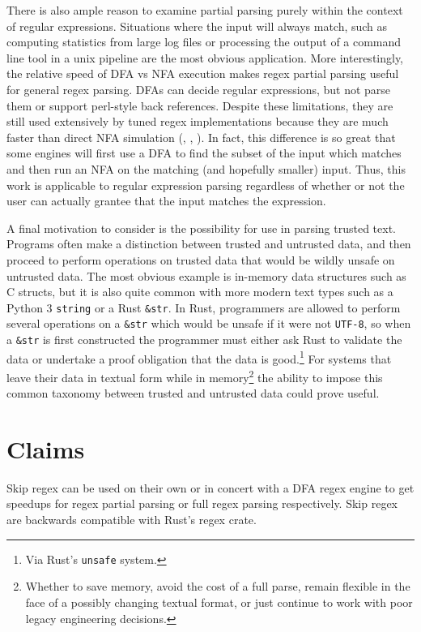There is also ample reason to examine partial parsing purely
within the context of regular expressions. Situations where the input
will always match, such as computing statistics from large log files
or processing the output of a command line tool in a unix pipeline
are the most obvious application. More interestingly, the
relative speed of DFA vs NFA execution makes regex partial parsing
useful for general regex parsing. DFAs can decide regular expressions,
but not parse them or support perl-style back references. Despite
these limitations, they are still used extensively by tuned regex
implementations because they are much faster than direct NFA
simulation (\cite{CoxRE2}, \cite{GallantRegex}, \cite{GoLang}).
In fact, this difference is so great that
some engines will first use a DFA to find the subset of the input
which matches and then run an NFA on the matching (and hopefully
smaller) input. Thus, this work is applicable
to regular expression parsing regardless of whether or not the user
can actually grantee that the input matches the expression.

A final motivation to consider is the possibility for use
in parsing trusted text. Programs often make a distinction between
trusted and untrusted data, and then proceed to perform operations
on trusted data that would be wildly unsafe on untrusted data.
The most obvious example is in-memory data structures such as C structs, but
it is also quite common with more modern text types such as
a Python 3 \verb'string' or a Rust \verb'&str'. In Rust, programmers
are allowed to perform several operations on a \verb'&str' which
would be unsafe if it were not \verb'UTF-8', so when a \verb'&str'
is first constructed the programmer must either ask Rust to validate
the data or undertake a proof obligation that the data is good.\footnote{
Via Rust's {\tt unsafe} system.} For systems that leave
their data in textual form while in memory\footnote{
Whether to save memory, avoid the cost of a full parse, remain
flexible in the face of a possibly changing textual format, or
just continue to work with poor legacy engineering decisions.}
the ability to impose this common taxonomy between trusted and
untrusted data could prove useful.

\section{Claims}

Skip regex can be used on their own or
in concert with a DFA regex engine to get speedups for
regex partial parsing or full regex parsing respectively.
Skip regex are backwards compatible with Rust's regex crate.

